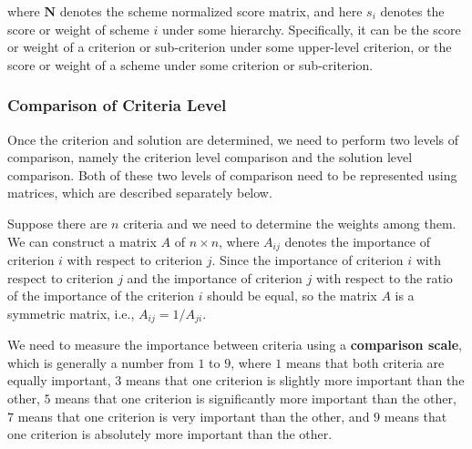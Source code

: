 \begin{itemize}
where $\textbf{N}$ denotes the scheme normalized score matrix, and here $s_i$ denotes the score or weight of scheme $i$ under some hierarchy. Specifically, it can be the score or weight of a criterion or sub-criterion under some upper-level criterion, or the score or weight of a scheme under some criterion or sub-criterion.

\end{itemize}

\subsubsection{Comparison of Criteria Level}
Once the criterion and solution are determined, we need to perform two levels of comparison, namely the criterion level comparison and the solution level comparison. Both of these two levels of comparison need to be represented using matrices, which are described separately below.


Suppose there are $n$ criteria and we need to determine the weights among them. We can construct a matrix $A$ of $n \times n$, where $A_{ij}$ denotes the importance of criterion $i$ with respect to criterion $j$. Since the importance of criterion $i$ with respect to criterion $j$ and the importance of criterion $j$ with respect to the ratio of the importance of the criterion $i$ should be equal, so the matrix $A$ is a symmetric matrix, i.e., $A_{ij}=1/A_{ji}$.

We need to measure the importance between criteria using a \textbf{comparison scale}, which is generally a number from $1$ to $9$, where $1$ means that both criteria are equally important, $3$ means that one criterion is slightly more important than the other, $5$ means that one criterion is significantly more important than the other, $7$ means that one criterion is very important than the other, and $9$ means that one criterion is absolutely more important than the other.

